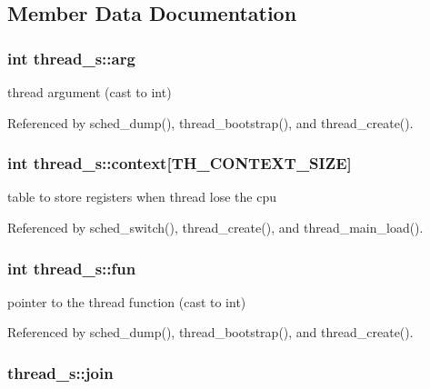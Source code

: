 \subsection{Member Data Documentation}
\hypertarget{structthread__s_a5cdab21069c6c184a86d024a0aa238aa}{
\subsubsection[{arg}]{\setlength{\rightskip}{0pt plus 5cm}int thread\-\_\-s\-::arg}}\label{structthread__s_a5cdab21069c6c184a86d024a0aa238aa}


thread argument (cast to int) 



Referenced by sched\-\_\-dump(), thread\-\_\-bootstrap(), and thread\-\_\-create().

\hypertarget{structthread__s_a668771e7e3444ba13544b50e1ff312a6}{
\subsubsection[{context}]{\setlength{\rightskip}{0pt plus 5cm}int thread\-\_\-s\-::context\mbox{[}{\bf T\-H\-\_\-\-C\-O\-N\-T\-E\-X\-T\-\_\-\-S\-I\-Z\-E}\mbox{]}}}\label{structthread__s_a668771e7e3444ba13544b50e1ff312a6}


table to store registers when thread lose the cpu 



Referenced by sched\-\_\-switch(), thread\-\_\-create(), and thread\-\_\-main\-\_\-load().

\hypertarget{structthread__s_a9a97385576dda275389e95ef13168cfc}{
\subsubsection[{fun}]{\setlength{\rightskip}{0pt plus 5cm}int thread\-\_\-s\-::fun}}\label{structthread__s_a9a97385576dda275389e95ef13168cfc}


pointer to the thread function (cast to int) 



Referenced by sched\-\_\-dump(), thread\-\_\-bootstrap(), and thread\-\_\-create().

\hypertarget{structthread__s_a84fafe08d8ef25fc4b5a8fb1e833619c}{
\subsubsection[{join}]{ thread\-\_\-s\-::join}}\label{structthread__s_a84fafe08d8ef25fc4b5a8fb1e833619c}


